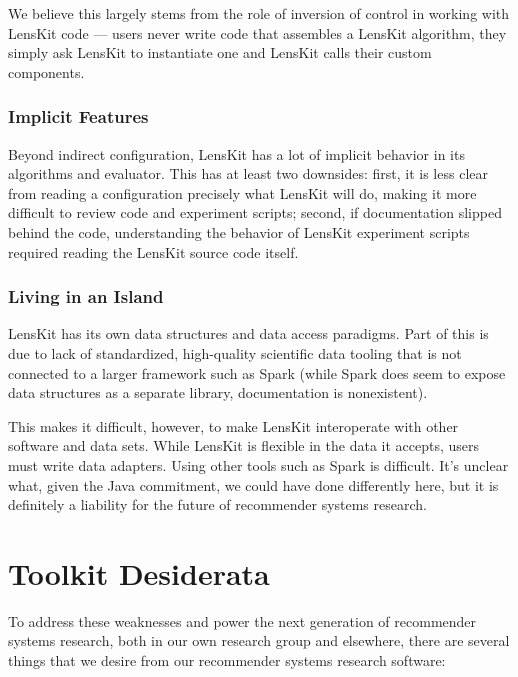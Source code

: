 We believe this largely stems from the role of inversion of control in working with LensKit code --- users never write code that assembles a LensKit algorithm, they simply ask LensKit to instantiate one and LensKit calls their custom components.

\subsubsection{Implicit Features}
Beyond indirect configuration, LensKit has a lot of implicit behavior in its algorithms and evaluator.
This has at least two downsides: first, it is less clear from reading a configuration precisely what LensKit will do, making it more difficult to review code and experiment scripts; second, if documentation slipped behind the code, understanding the behavior of LensKit experiment scripts required reading the LensKit source code itself.

\subsubsection{Living in an Island}
LensKit has its own data structures and data access paradigms.
Part of this is due to lack of standardized, high-quality scientific data tooling that is not connected to a larger framework such as Spark (while Spark does seem to expose data structures as a separate library, documentation is nonexistent).

This makes it difficult, however, to make LensKit interoperate with other software and data sets. While LensKit is flexible in the data it accepts, users must write data adapters.
Using other tools such as Spark is difficult.
It's unclear what, given the Java commitment, we could have done differently here, but it is definitely a liability for the future of recommender systems research.

\section{Toolkit Desiderata}
To address these weaknesses and power the next generation of recommender systems research, both in our own research group and elsewhere, there are several things that we desire from our recommender systems research software:

